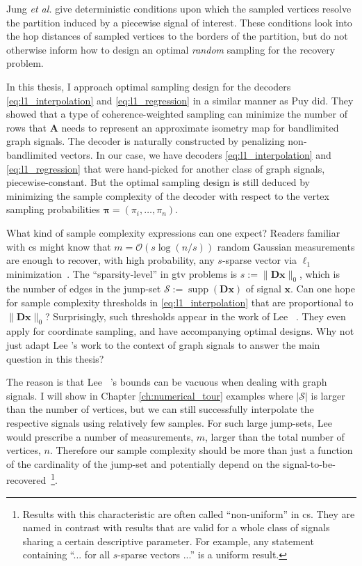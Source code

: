 Jung \textit{et al.} \cite{jung2016} give deterministic conditions upon which the sampled vertices resolve the partition induced by a piecewise signal of interest. These conditions look into the hop distances of sampled vertices to the borders of the partition, but do not otherwise inform how to design an optimal \emph{random} sampling for the recovery problem.

In this thesis, I approach optimal sampling design for the decoders \eqref{eq:l1_interpolation} and \eqref{eq:l1_regression} in a similar manner as Puy \etal \cite{puy2016} did. They showed that a type of coherence-weighted sampling can minimize the number of rows that $\mathbf{A}$ needs to represent an approximate isometry map for bandlimited graph signals. The decoder is naturally constructed by penalizing non-bandlimited vectors. In our case, we have decoders \eqref{eq:l1_interpolation} and \eqref{eq:l1_regression} that were hand-picked for another class of graph signals, piecewise-constant. But the optimal sampling design is still deduced by minimizing the sample complexity of the decoder with respect to the vertex sampling probabilities $\bm{\pi} = (\pi_i, \dots, \pi_n)$.

What kind of sample complexity expressions can one expect? Readers familiar with \acrlong{cs} might know that $m = \mathcal{O} \left( s \log (n/s) \right)$ random Gaussian measurements are enough to recover, with high probability, any $s$-sparse vector via $\ell_1$ minimization~\cite[Chapter 9]{foucart2013}. The ``sparsity-level'' in \acrfull{gtv} problems is $s := \|\mathbf{Dx}\|_0$, which is the number of edges in the jump-set $\mathcal{S} := \operatorname{supp}\left ( \mathbf{Dx} \right )$ of signal $\mathbf{x}$. Can one hope for sample complexity thresholds in \eqref{eq:l1_interpolation} that are proportional to $\|\mathbf{Dx}\|_0$? Surprisingly, such thresholds appear in the work of Lee \etal~\cite{lee2018}. They even apply for coordinate sampling, and have accompanying optimal designs. Why not just adapt Lee \etal's work to the context of graph signals to answer the main question in this thesis?

The reason is that Lee \etal~\cite{lee2018}'s bounds can be vacuous when dealing with graph signals. I will show in Chapter \ref{ch:numerical_tour} examples where $|\mathcal{S}|$ is larger than the number of vertices, but we can still successfully interpolate the respective signals using relatively few samples. For such large jump-sets, Lee \etal~\cite{lee2018} would prescribe a number of measurements, $m$, larger than the total number of vertices, $n$. Therefore our sample complexity should be more than just a function of the cardinality of the jump-set and potentially depend on the signal-to-be-recovered~\footnote{Results with this characteristic are often called ``non-uniform'' in \acrlong{cs}. They are named in contrast with results that are valid for a whole class of signals sharing a certain descriptive parameter. For example, any statement containing ``... for all $s$-sparse vectors ...'' is a uniform result.}.

